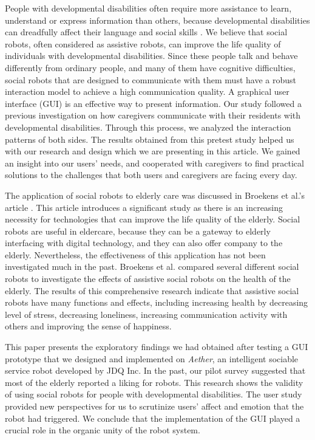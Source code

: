 \documentclass[letterpaper, 10 pt, conference]{ieeeconf}  %
\begin{document}
People with developmental disabilities often require more assistance to learn, understand or express information than others, because developmental disabilities can dreadfully affect their language and social skills \cite{DSOntario2016}. We believe that social robots, often considered as assistive robots, can improve the life quality of individuals with developmental disabilities. Since these people talk and behave differently from ordinary people, and many of them have cognitive difficulties, social robots that are designed to communicate with them must have a robust interaction model to achieve a high communication quality. A graphical user interface (GUI) is an effective way to present information. Our study followed a previous investigation on how caregivers communicate with their residents with developmental disabilities. Through this process, we analyzed the interaction patterns of both sides. The results obtained from this pretest study helped us with our research and design which we are presenting in this article. We gained an insight into our users' needs, and cooperated with caregivers to find practical solutions to the challenges that both users and caregivers are facing every day.

The application of social robots to elderly care was discussed in Broekens et al.'s article \cite{Broekens2009}. This article introduces a significant study as there is an increasing necessity for technologies that can improve the life quality of the elderly. Social robots are useful in eldercare, because they can be a gateway to elderly interfacing with digital technology, and they can also offer company to the elderly. Nevertheless, the effectiveness of this application has not been investigated much in the past. Broekens et al. compared several different social robots to investigate the effects of assistive social robots on the health of the elderly. The results of this comprehensive research indicate that assistive social robots have many functions and effects, including increasing health by decreasing level of stress, decreasing loneliness, increasing communication activity with others and improving the sense of happiness.

This paper presents the exploratory findings we had obtained after testing a GUI prototype that we designed and implemented on \textit{Aether}, an intelligent sociable service robot developed by JDQ Inc. In the past, our pilot survey suggested that most of the elderly reported a liking for robots. This research shows the validity of using social robots for people with developmental disabilities. The user study provided new perspectives for us to scrutinize users' affect and emotion that the robot had triggered. We conclude that the implementation of the GUI played a crucial role in the organic unity of the robot system.
\end{document}
